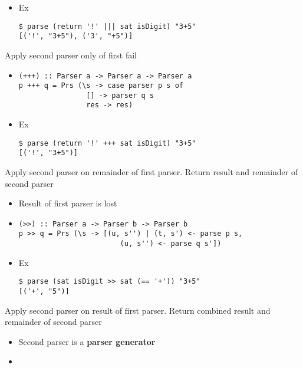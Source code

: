\begin{itemize}
\begin{itemize}
\begin{itemize}
\begin{verbatim}
(|||) :: Parser a -> Parser a -> Parser a
p ||| q = Prs (\s -> Parser p s ++ parser q s)
\end{verbatim}
                    \item Ex
\begin{verbatim}
$ parse (return '!' ||| sat isDigit) "3+5"
[('!', "3+5"), ('3', "+5")]
\end{verbatim}
                \end{itemize}
             Apply second parser only of first fail
                \begin{itemize}
                    \item
\begin{verbatim}
(+++) :: Parser a -> Parser a -> Parser a
p +++ q = Prs (\s -> case parser p s of
                [] -> parser q s
                res -> res)
\end{verbatim}
                    \item Ex
\begin{verbatim}
$ parse (return '!' +++ sat isDigit) "3+5"
[('!', "3+5")]
\end{verbatim}
                \end{itemize}
             Apply second parser on remainder of first parser. Return result and remainder of second parser
                \begin{itemize}
                    \item Result of first parser is lost
                    \item
\begin{verbatim}
(>>) :: Parser a -> Parser b -> Parser b
p >> q = Prs (\s -> [(u, s'') | (t, s') <- parse p s,
                        (u, s'') <- parse q s'])
\end{verbatim}
                    \item Ex
\begin{verbatim}
$ parse (sat isDigit >> sat (== '+')) "3+5"
[('+', "5")]
\end{verbatim}
                \end{itemize}
                 Apply second parser on result of first parser. Return combined result and remainder of second parser
                    \begin{itemize}
                        \item Second parser is a \textbf{parser generator}
                        \item
\begin{verbatim}

\end{verbatim}
\end{itemize}
\end{itemize}
\end{itemize}
